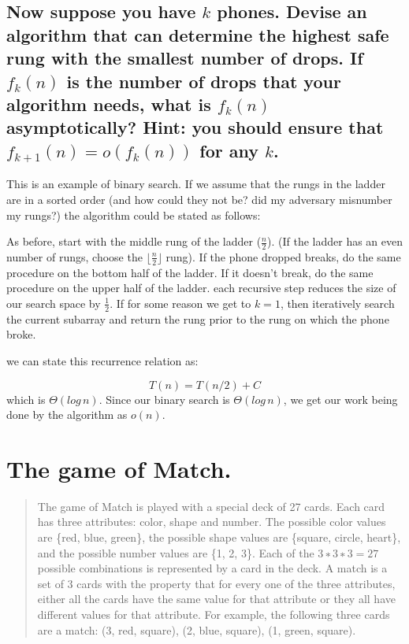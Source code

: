 \documentclass[titlepage]{article}\usepackage[]{graphicx}\usepackage[]{color}
\begin{document}
\subsection{Now suppose you have $k$ phones. Devise an algorithm that can
  determine the highest safe rung with the smallest number of drops. If
  $f_k(n)$
  is the number of drops that your algorithm needs, what is 
  $f_k(n)$ asymptotically? Hint: you should ensure that 
  $f_{k+1}(n) = o(f_k(n))$ for any $k$.}

  This is an example of binary search. If we assume that the rungs in the
  ladder are in a sorted order (and how could they not be? did my adversary
  misnumber my rungs?)  the algorithm could
  be stated as follows:

  As before, start with the middle rung of the ladder ($\frac{n}{2}$). (If the
  ladder has an even number of rungs, choose the $\lfloor
  \frac{n}{2} \rfloor$ rung). If the
  phone dropped breaks, do the same procedure on the bottom half of the ladder.
  If it doesn't break, do the same procedure on the upper half of the ladder.
  each recursive step reduces the size of our search space by $\frac{1}{2}$. If
  for some reason we get to $k=1$, then iteratively search the current subarray
  and return the rung prior to the rung on which the phone broke.

  we can state this recurrence relation as:

  \[ T(n) = T(n/2) + C \]
  which is $\Theta(log\,n)$. Since our binary search is $\Theta(log\,n)$, we
  get our work being done by the algorithm as $o(n)$. 
  

  \section{ The game of Match. }
  \begin{quote}
  The game of Match is played with a special deck of 27 cards. Each card has
  three attributes: color, shape and number. The possible color values are
  \{red, blue, green\}, the possible shape values are \{square, circle, heart\},
  and the possible number values are \{1, 2, 3\}. Each of the $3 ∗ 3 ∗ 3 = 27$
  possible combinations is represented by a card in the deck. A match is a set
  of 3 cards with the property that for every one of the three attributes,
  either all the cards have the same value for that attribute or they all have
  different values for that attribute. For example, the following three cards
  are a match: (3, red, square), (2, blue, square), (1, green, square).
  \end{quote}
\end{document}
